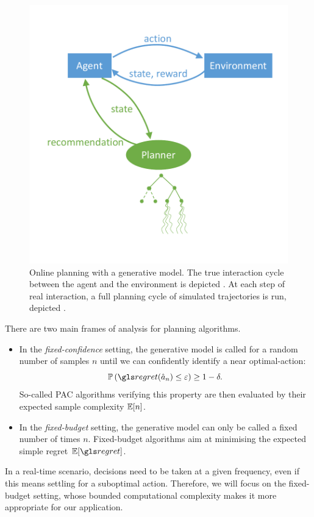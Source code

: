 \begin{figure}[ht]
	\centering
	\includegraphics[trim = {0 1.3cm 0 1.3cm}, clip, width=0.7\linewidth]{img/online_planning}
	\caption{Online planning with a generative model. The true interaction cycle between the agent and the environment is depicted . At each step of real interaction, a full planning cycle of simulated trajectories is run, depicted .}
	\label{fig:online-planning}
\end{figure}

There are two main frames of analysis for planning algorithms. 
\begin{itemize}
\item In the \emph{fixed-confidence} setting, the generative model is called for a random number of samples $n$ until we can confidently identify a near optimal-action:
\begin{equation*}
\probability{\regret(\hat{a}_n) \leq \epsilon} \geq 1-\delta.
\end{equation*}
So-called \gls{PAC} algorithms verifying this property are then evaluated by their expected sample complexity $\operatorname*{\mathbb{E}} [n]$.
\item In the \emph{fixed-budget} setting, the generative model can only be called a fixed number of times $n$. Fixed-budget algorithms aim at minimising the expected simple regret $\expectedvalue[\regret]$.
\end{itemize}
In a real-time scenario, decisions need to be taken at a given frequency, even if this means settling for a suboptimal action. Therefore, we will focus on the fixed-budget setting, whose bounded computational complexity makes it more appropriate for our application.

